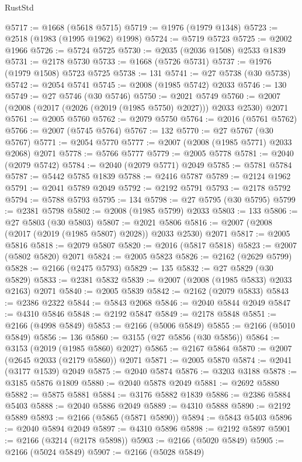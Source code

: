\begin{lexlean}{RustStd}
\begin{coremodule}
@5717 := @1668 (@5618 @5715)
@5719 := @1976 (@1979 @1348)
@5723 := @2518 (@1983 (@1995 @1962) @1998)
@5724 := @5719 @5723
@5725 := @2002 @1966
@5726 := @5724 @5725
@5730 := @2035 (@2036 @1508) @2533 @1839
@5731 := @2178 @5730
@5733 := @1668 (@5726 @5731)
@5737 := @1976 (@1979 @1508) @5723 @5725
@5738 := 131
@5741 := @27 @5738 (@30 @5738)
@5742 := @2054 @5741
@5745 := @2008 (@1985 @5742) @2033
@5746 := 130
@5749 := @27 @5746 (@30 @5746)
@5750 := @2021 @5749
@5760 := @2007 (@2008 (@2017 (@2026 (@2019 (@1985 @5750) @2027))) @2033 @2530) @2071
@5761 := @2005 @5760
@5762 := @2079 @5750
@5764 := @2016 (@5761 @5762)
@5766 := @2007 (@5745 @5764)
@5767 := 132
@5770 := @27 @5767 (@30 @5767)
@5771 := @2054 @5770
@5777 := @2007 (@2008 (@1985 @5771) @2033 @2068) @2071
@5778 := @5766 @5777
@5779 := @2005 @5778
@5781 := @2040 (@2079 @5742)
@5784 := @2040 (@2079 @5771) @2049
@5785 := @5781 @5784
@5787 := @5442 @5785 @1839
@5788 := @2416 @5787
@5789 := @2124 @1962
@5791 := @2041 @5789 @2049
@5792 := @2192 @5791
@5793 := @2178 @5792
@5794 := @5788 @5793
@5795 := 134
@5798 := @27 @5795 (@30 @5795)
@5799 := @2381 @5798
@5802 := @2008 (@1985 @5799) @2033
@5803 := 133
@5806 := @27 @5803 (@30 @5803)
@5807 := @2021 @5806
@5816 := @2007 (@2008 (@2017 (@2019 (@1985 @5807) @2028)) @2033 @2530) @2071
@5817 := @2005 @5816
@5818 := @2079 @5807
@5820 := @2016 (@5817 @5818)
@5823 := @2007 (@5802 @5820) @2071
@5824 := @2005 @5823
@5826 := @2162 (@2629 @5799)
@5828 := @2166 (@2475 @5793)
@5829 := 135
@5832 := @27 @5829 (@30 @5829)
@5833 := @2381 @5832
@5839 := @2007 (@2008 (@1985 @5833) @2033 @2163) @2071
@5840 := @2005 @5839
@5842 := @2162 (@2079 @5833)
@5843 := @2386 @2322
@5844 := @5843 @2068
@5846 := @2040 @5844 @2049
@5847 := @4310 @5846
@5848 := @2192 @5847
@5849 := @2178 @5848
@5851 := @2166 (@4998 @5849)
@5853 := @2166 (@5006 @5849)
@5855 := @2166 (@5010 @5849)
@5856 := 136
@5860 := @3155 (@27 @5856 (@30 @5856))
@5864 := @3153 (@2019 (@1985 @5860) @2027)
@5865 := @2167 @5864
@5870 := @2007 (@2645 @2033 (@2179 @5860)) @2071
@5871 := @2005 @5870
@5874 := @2041 (@3177 @1539) @2049
@5875 := @2040 @5874
@5876 := @3203 @3188
@5878 := @3185 @5876 @1809
@5880 := @2040 @5878 @2049
@5881 := @2692 @5880
@5882 := @5875 @5881
@5884 := @3176 @5882 @1839
@5886 := @2386 @5884 @5403
@5888 := @2040 @5886 @2049
@5889 := @4310 @5888
@5890 := @2192 @5889
@5893 := @2166 (@5865 (@5871 @5890))
@5894 := @5843 @5403
@5896 := @2040 @5894 @2049
@5897 := @4310 @5896
@5898 := @2192 @5897
@5901 := @2166 (@3214 (@2178 @5898))
@5903 := @2166 (@5020 @5849)
@5905 := @2166 (@5024 @5849)
@5907 := @2166 (@5028 @5849)

\end{coremodule}
\end{lexlean}
